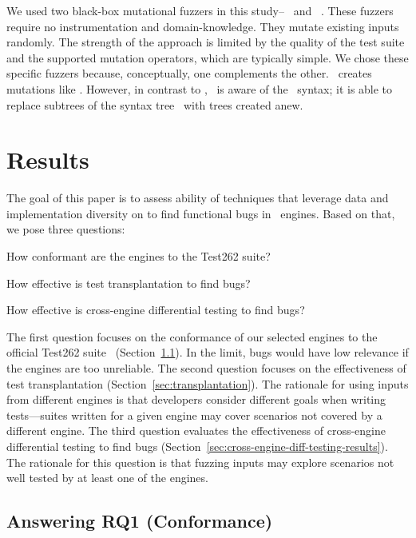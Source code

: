 \documentclass[sigconf,review, anonymous]{acmart}
\begin{document}
We used two black-box mutational fuzzers in this
study--\radamsa~\cite{radamsa} and \quickfuzz~\cite{quickfuzz}. These
fuzzers require no instrumentation and domain-knowledge. They mutate
existing inputs randomly. The strength of the approach is
limited by the quality of the test suite and the supported mutation
operators, which are typically simple. We chose these specific fuzzers
because, conceptually, one complements the other. \quickfuzz\ creates
mutations like \radamsa. However, in contrast to \radamsa, \quickfuzz\ is aware
of the \js\ syntax; it is able to replace subtrees of the syntax
tree~\cite{grieco2016quickfuzz} with trees created anew.

\section{Results}
\label{sec:results}

The goal of this paper is to assess ability of techniques that
leverage data and implementation diversity on to find functional bugs
in \javascript\ engines. Based on that, we pose three questions:
\begin{description}[leftmargin=.5in]
\item[RQ1.] How conformant are the engines to the Test262 suite?
\item[RQ2.] How effective is test transplantation to find bugs?
\item[RQ3.] How effective is cross-engine differential testing to find bugs?  
\end{description}

The first question focuses on the conformance of our selected engines
to the official Test262 suite~\cite{ecma262-conformance-suite}
(Section~\ref{sec:stability}). In the limit, bugs would have low
relevance if the engines are too unreliable. The second question
focuses on the effectiveness of test transplantation
(Section~\ref{sec:transplantation}). The rationale for using inputs
from different engines is that developers consider different goals
when writing tests---suites written for a given engine may cover
scenarios not covered by a different engine. The third question
evaluates the effectiveness of cross-engine differential testing to
find bugs (Section~\ref{sec:cross-engine-diff-testing-results}). The
rationale for this question is that fuzzing inputs may explore
scenarios not well tested by at least one of the engines.

\subsection{Answering RQ1 (Conformance)}
\label{sec:stability}
\end{document}
